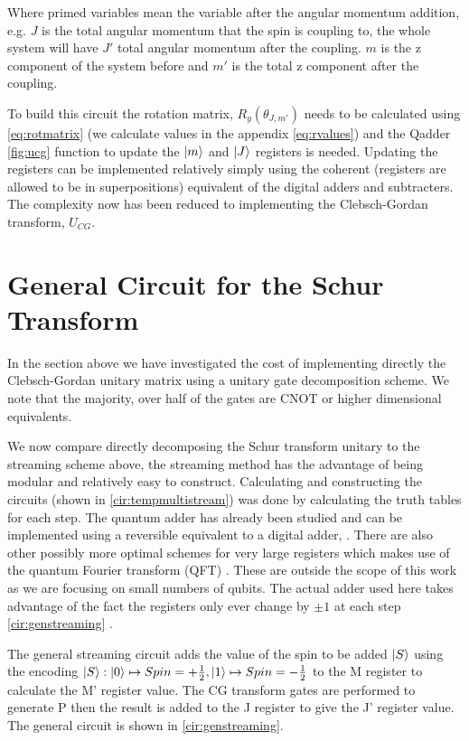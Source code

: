 \documentclass[12pt]{article}
\begin{document}
Where primed variables mean the variable after the angular momentum addition, e.g. $J$ is the total angular momentum that the spin is coupling to, the whole system will have $J'$ total angular momentum after the coupling. $m$ is the z component of the system before and $m'$ is the total z component after the coupling.

To build this circuit the rotation matrix, $R_y(\theta_{J,m'})$ needs to be calculated using \autoref{eq:rotmatrix} (we calculate values in the appendix \autoref{eq:rvalues}) and the Qadder \autoref{fig:ucg} function to update the $\left\vert{m}\right\rangle$ and $\left\vert{J}\right\rangle$ registers is needed. Updating the registers can be implemented relatively simply using the coherent (registers are allowed to be in superpositions) equivalent of the digital adders and subtracters. The complexity now has been reduced to implementing the Clebsch-Gordan transform, $U_{CG}$.

\section{General Circuit for the Schur Transform}

In the section above we have investigated the cost of implementing directly the Clebsch-Gordan unitary matrix using a unitary gate decomposition scheme. We note that the majority, over half of the gates are CNOT or higher dimensional equivalents.

We now compare directly decomposing the Schur transform unitary to the streaming scheme above, the streaming method has the advantage of being modular and relatively easy to construct. Calculating and constructing the circuits (shown in \autoref{cir:tempmultistream}) was done by calculating the truth tables for each step. The quantum adder has already been studied and can be implemented using a reversible equivalent to a digital adder, \cite{draper2004logarithmic}. There are also other possibly more optimal schemes for very large registers which makes use of the quantum Fourier transform (QFT) \cite{draper2000addition}. These are outside the scope of this work as we are focusing on small numbers of qubits. The actual adder used here takes advantage of the fact the registers only ever change by $\pm1$ at each step \autoref{cir:genstreaming} . 

The general streaming circuit adds the value of the spin to be added $\left\vert{S}\right\rangle$ using the encoding $\left\vert{S}\right\rangle : \left\vert{0}\right\rangle \mapsto Spin = +\frac{1}{2}, \left\vert{1}\right\rangle \mapsto Spin = -\frac{1}{2}$ to the M register to calculate the M' register value. The CG transform gates are performed to generate P then the result is added to the J register to give the J' register value. The general circuit is shown in \autoref{cir:genstreaming}.
\end{document}
